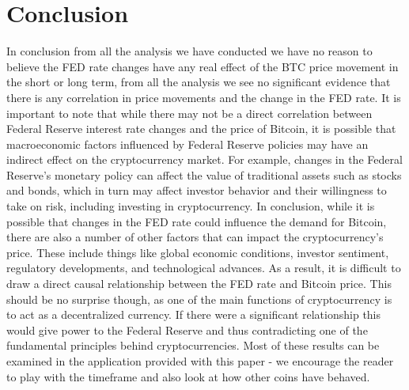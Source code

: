 \documentclass[12pt]{article}
\begin{document}
\section{Conclusion}
In conclusion from all the analysis we have conducted we have no reason to believe the FED rate changes have any real effect of the BTC price movement in the short or long term, from all the analysis we see no significant evidence that there is any correlation in price movements and the change in the FED rate.
\newline
\newline
It is important to note that while there may not be a direct correlation between Federal Reserve interest rate changes and the price of Bitcoin, it is possible that macroeconomic factors influenced by Federal Reserve policies may have an indirect effect on the cryptocurrency market. For example, changes in the Federal Reserve's monetary policy can affect the value of traditional assets such as stocks and bonds, which in turn may affect investor behavior and their willingness to take on risk, including investing in cryptocurrency.
\newline
\newline
In conclusion, while it is possible that changes in the FED rate could influence the demand for Bitcoin, there are also a number of other factors that can impact the cryptocurrency's price. These include things like global economic conditions, investor sentiment, regulatory developments, and technological advances. As a result, it is difficult to draw a direct causal relationship between the FED rate and Bitcoin price.
\newline
\newline
This should be no surprise though, as one of the main functions of cryptocurrency is to act as a decentralized currency. If there were a significant relationship this would give power to the Federal Reserve and thus contradicting one of the fundamental principles behind cryptocurrencies. Most of these results can be examined in the application provided with this paper - we encourage the reader to play with the timeframe and also look at how other coins have behaved.
\end{document}
